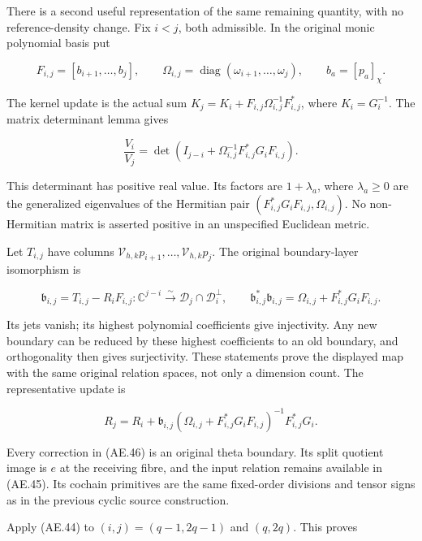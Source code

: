 There is a second useful representation of the same remaining quantity,
with no reference-density change. Fix \(i<j\), both admissible. In the
original monic polynomial basis put

\[
 F_{i,j}=[b_{i+1},\ldots,b_j],\qquad
 \Omega_{i,j}=\operatorname{diag}(\omega_{i+1},\ldots,\omega_j),
 \qquad b_a=[p_a]_\chi.                                                 \tag{AE.43}\label{AE.eq.43}
\]

The kernel update is the actual sum
\(K_j=K_i+F_{i,j}\Omega_{i,j}^{-1}F_{i,j}^*\), where \(K_i=G_i^{-1}\).
The matrix determinant lemma gives

\[
 \boxed{\frac{V_i}{V_j}
 =\det\!\left(I_{j-i}+\Omega_{i,j}^{-1}F_{i,j}^*G_iF_{i,j}\right).}       \tag{AE.44}\label{AE.eq.44}
\]

This determinant has positive real value. Its factors are
\(1+\lambda_a\), where \(\lambda_a\ge0\) are the generalized eigenvalues
of the Hermitian pair \((F_{i,j}^*G_iF_{i,j},\Omega_{i,j})\). No
non-Hermitian matrix is asserted positive in an unspecified Euclidean
metric.

Let \(T_{i,j}\) have columns \(\mathcal V_{h,k}p_{i+1},\ldots,
\mathcal V_{h,k}p_j\). The original boundary-layer isomorphism is

\[
 \mathfrak b_{i,j}=T_{i,j}-R_iF_{i,j}:
 \mathbb C^{j-i}\xrightarrow{\sim}
 \mathcal D_j\cap\mathcal D_i^\perp,
 \qquad
 \mathfrak b_{i,j}^*\mathfrak b_{i,j}
 =\Omega_{i,j}+F_{i,j}^*G_iF_{i,j}.                                     \tag{AE.45}\label{AE.eq.45}
\]

Its jets vanish; its highest polynomial coefficients give injectivity.
Any new boundary can be reduced by these highest coefficients to an old
boundary, and orthogonality then gives surjectivity. These statements
prove the displayed map with the same original relation spaces, not only
a dimension count. The representative update is

\[
 R_j=R_i+
 \mathfrak b_{i,j}
 (\Omega_{i,j}+F_{i,j}^*G_iF_{i,j})^{-1}F_{i,j}^*G_i.                    \tag{AE.46}\label{AE.eq.46}
\]

Every correction in (AE.46) is an original theta boundary. Its split
quotient image is \(e\) at the receiving fibre, and the input relation
remains available in (AE.45). Its cochain primitives are the same
fixed-order divisions and tensor signs as in the previous cyclic source
construction.

Apply (AE.44) to \((i,j)=(q-1,2q-1)\) and \((q,2q)\). This proves

